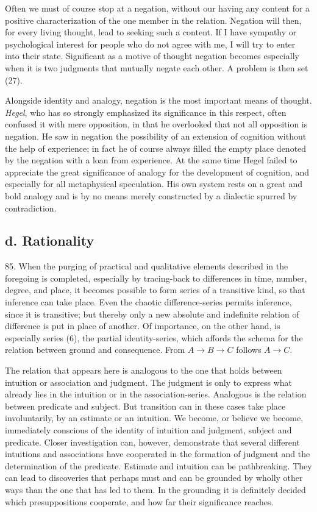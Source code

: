 \documentclass[12pt,a4paper]{book}
\newcommand{\opage}[1]{\marginnote{\footnotesize\textit{[#1]}}}
\begin{document}
Often we must of course stop at a negation, without our having any content
for a positive characterization of the one member in the relation. Negation
will then, for every living thought, lead to seeking such a content. If I
have sympathy or psychological interest for people who do not agree with me,
I will try to enter into their state. Significant as a motive of thought
negation becomes especially when it is two judgments that mutually negate
each other. A problem is then set (27).

\opage{204}Alongside identity and analogy, negation is the most important means of
thought. \emph{Hegel}, who has so strongly emphasized its significance in
this respect, often confused it with mere opposition, in that he overlooked
that not all opposition is negation. He saw in negation the possibility of an
extension of cognition without the help of experience; in fact he of course
always filled the empty place denoted by the negation with a loan from
experience. At the same time Hegel failed to appreciate the great
significance of analogy for the development of cognition, and especially for
all metaphysical speculation. His own system rests on a great and bold
analogy and is by no means merely constructed by a dialectic spurred by
contradiction.

\subsection*{d. Rationality}

85. When the purging of practical and qualitative elements described in the
foregoing is completed, especially by tracing-back to differences in time,
number, degree, and place, it becomes possible to form series of a transitive
kind, so that inference can take place. Even the chaotic difference-series
permits inference, since it is transitive; but thereby only a new absolute
and indefinite relation of difference is put in place of another. Of
importance, on the other hand, is especially series (6), the partial
identity-series, which affords the schema for the relation between ground and
consequence. From $A \to B \to C$ follows $A \to C$.

The relation that appears here is analogous to the one that holds between
intuition or association and judgment. The judgment is only to express what
already lies in the intuition or in the association-series. Analogous is the
relation between predicate and subject. But transition can in these cases
take place involuntarily, by an estimate or an intuition. We become, or
believe we become, immediately conscious of the identity of intuition and
judgment, subject and predicate. Closer investigation can, however,
demonstrate that several different intuitions and associations have
cooperated in the formation of judgment and the determination of the
predicate. Estimate and intuition can be pathbreaking. They can lead to
discoveries that perhaps must \opage{205}and can be grounded by wholly other ways than
the one that has led to them. In the grounding it is definitely decided which
presuppositions cooperate, and how far their significance reaches.
\end{document}
